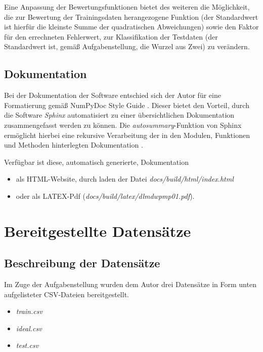 Eine Anpassung der Bewertungsfunktionen bietet des weiteren die Möglichkeit, die zur Bewertung der Trainingsdaten herangezogene Funktion (der Standardwert ist hierfür die kleinste Summe der quadratischen Abweichungen) sowie den Faktor für den errechneten Fehlerwert, zur Klassifikation der Testdaten (der Standardwert ist, gemäß Aufgabenstellung, die Wurzel aus Zwei) zu verändern.

\subsection{Dokumentation}

Bei der Dokumentation der Software entschied sich der Autor für eine Formatierung gemäß NumPyDoc Style Guide \citep{numpydoc_v160_style_nodate}. Dieser bietet den Vorteil, durch die Software \emph{Sphinx} automatisiert zu einer übersichtlichen Dokumentation zusammengefasst werden zu können. Die \emph{autosummary}-Funktion von Sphinx ermöglicht hierbei eine rekursive Verarbeitung der in den Modulen, Funktionen und Methoden hinterlegten Dokumentation \citep{leedham_answer_2020}.

Verfügbar ist diese, automatisch generierte, Dokumentation
\begin{itemize}
 \itemsep0pt
 \item als HTML-Website, durch laden der Datei \emph{docs/build/html/index.html}
 \item oder als LATEX-Pdf (\emph{docs/build/latex/dlmdwpmp01.pdf}).
\end{itemize}


\section{Bereitgestellte Datensätze}

\subsection{Beschreibung der Datensätze}

Im Zuge der Aufgabenstellung wurden dem Autor drei Datensätze in Form unten aufgelisteter CSV-Dateien bereitgestellt.

\begin{itemize}
 \itemsep0pt
 \item \emph{train.csv}
 \item \emph{ideal.csv}
 \item \emph{test.csv}
\end{itemize}

